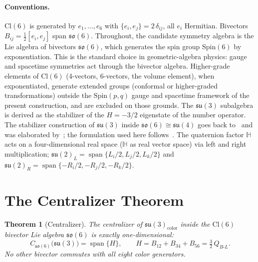 \documentclass[aip,jmp,amsmath,amssymb,reprint,author-year]{revtex4-2}
\newtheorem{theorem}{Theorem}
\begin{document}
\paragraph{Conventions.}
$\mathrm{Cl}(6)$ is generated by $e_1, \ldots, e_6$ with
$\{e_i, e_j\} = 2\,\delta_{ij}$, all $e_i$ Hermitian.  Bivectors
$B_{ij} = \tfrac{1}{2}[e_i, e_j]$ span $\mathfrak{so}(6)$.  Throughout,
the candidate symmetry algebra is the Lie algebra of bivectors
$\mathfrak{so}(6)$, which generates the spin group $\mathrm{Spin}(6)$ by
exponentiation.  This is the standard choice in geometric-algebra
physics: gauge and spacetime symmetries act through the bivector algebra.
Higher-grade elements of $\mathrm{Cl}(6)$ (4-vectors, 6-vectors, the
volume element), when exponentiated, generate extended groups (conformal
or higher-graded transformations) outside the
$\mathrm{Spin}(p,q)$ gauge and spacetime framework of the present
construction, and are excluded on those grounds.  The $\mathfrak{su}(3)$
subalgebra is derived as the stabilizer of the $H = -3/2$ eigenstate of
the number operator.  The stabilizer construction of $\mathfrak{su}(3)$
inside $\mathfrak{so}(6) \cong \mathfrak{su}(4)$ goes back
to~\citet{GunaydinGursey1973} and was elaborated
by~\citet{Dixon1994}; the formulation used here
follows~\citet{Furey2016}.
The quaternion factor $\mathbb{H}$ acts on a four-dimensional real space
($\mathbb{H}$ as real vector space) via left and right multiplication;
$\mathfrak{su}(2)_L = \operatorname{span}\{L_i/2, L_j/2, L_k/2\}$ and
$\mathfrak{su}(2)_R = \operatorname{span}\{-R_i/2, -R_j/2, -R_k/2\}$.

\section{The Centralizer Theorem}
\label{sec:centralizer}

\begin{theorem}[Centralizer]
\label{thm:centralizer}
The centralizer of\/ $\mathfrak{su}(3)_{\mathrm{color}}$ inside the\/
$\mathrm{Cl}(6)$ bivector Lie algebra $\mathfrak{so}(6)$ is exactly
one-dimensional:
\begin{equation}
\label{eq:centralizer}
C_{\mathfrak{so}(6)}\!\bigl(\mathfrak{su}(3)\bigr)
  = \operatorname{span}\{H\},
\qquad
H = B_{12} + B_{34} + B_{56} = \tfrac{3}{2}\,Q_{B\text{-}L}.
\end{equation}
No other bivector commutes with all eight color generators.
\end{theorem}
\end{document}

